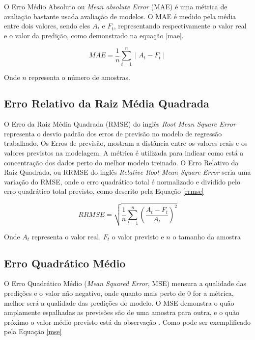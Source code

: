 O Erro Médio Absoluto ou \emph{Mean absolute Error} (MAE) é uma métrica de avaliação bastante usada avaliação de modelos. O MAE é medido pela média entre dois valores, sendo eles {$A_t$} e {$F_t$}, representando respectivamente o valor real e o valor da predição, como demonstrado na equação \ref{mae}.

\begin{equation}
\label{mae}
    MAE = \frac{1}{n} \sum_{t=1}^n \mid A_t - F_t \mid
\end{equation}

Onde {$n$} representa o número de amostras.

\subsection{Erro Relativo da Raiz Média Quadrada}

O Erro da Raiz Média Quadrada (RMSE) do inglês \emph{Root Mean Square Error} representa o desvio padrão dos erros de previsão no modelo de regressão trabalhado. Os Erros de previsão, mostram a distância entre os valores reais e os valores previstos na modelagem. A métrica é utilizada para indicar como está a concentração dos dados perto do melhor modelo treinado. O Erro Relativo da Raiz Quadrada, ou RRMSE do inglês \emph{Relative Root Mean Square Error} seria uma variação do RMSE, onde o erro quadrático total é normalizado e dividido pelo erro quadrático total previsto\cite{rna3}, como descrito pela Equação \ref{rrmse}

\begin{equation}
\label{rrmse}
    RRMSE = \sqrt{\frac{1}{n} \sum_{t=1}^n  (\frac{A_t - F_t}{A_t})^2}
\end{equation}

Onde {$A_t$} representa o valor real, {$F_t$} o valor previsto e {$n$} o tamanho da amostra

\subsection{Erro Quadrático Médio}

O Erro Quadrático Médio (\emph{Mean Squared Error}, MSE) mensura a qualidade das predições e o valor não negativo, onde quanto mais perto de 0 for a métrica, melhor será a qualidade das predições do modelo. O MSE demonstra o quão amplamente espalhadas as previsões são de uma amostra para outra, e o quão próximo o valor médio previsto está da observação \cite{ma2}. Como pode ser exemplificado pela Equação \ref{mse}

